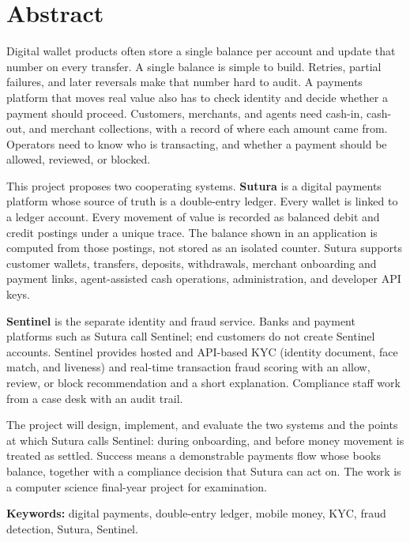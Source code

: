 \documentclass[12pt,a4paper]{article}
\begin{document}
\newpage
\section*{Abstract}

Digital wallet products often store a single balance per account and update that number on every transfer. A single balance is simple to build. Retries, partial failures, and later reversals make that number hard to audit. A payments platform that moves real value also has to check identity and decide whether a payment should proceed. Customers, merchants, and agents need cash-in, cash-out, and merchant collections, with a record of where each amount came from. Operators need to know who is transacting, and whether a payment should be allowed, reviewed, or blocked.

This project proposes two cooperating systems. \textbf{Sutura} is a digital payments platform whose source of truth is a double-entry ledger. Every wallet is linked to a ledger account. Every movement of value is recorded as balanced debit and credit postings under a unique trace. The balance shown in an application is computed from those postings, not stored as an isolated counter. Sutura supports customer wallets, transfers, deposits, withdrawals, merchant onboarding and payment links, agent-assisted cash operations, administration, and developer API keys.

\textbf{Sentinel} is the separate identity and fraud service. Banks and payment platforms such as Sutura call Sentinel; end customers do not create Sentinel accounts. Sentinel provides hosted and API-based KYC (identity document, face match, and liveness) and real-time transaction fraud scoring with an allow, review, or block recommendation and a short explanation. Compliance staff work from a case desk with an audit trail.

The project will design, implement, and evaluate the two systems and the points at which Sutura calls Sentinel: during onboarding, and before money movement is treated as settled. Success means a demonstrable payments flow whose books balance, together with a compliance decision that Sutura can act on. The work is a computer science final-year project for examination.

\textbf{Keywords:} digital payments, double-entry ledger, mobile money, KYC, fraud detection, Sutura, Sentinel.
\end{document}
